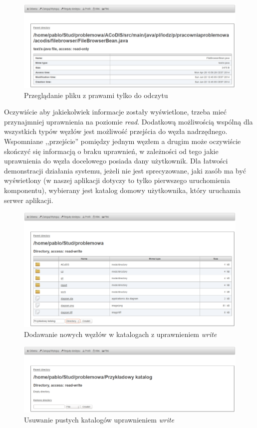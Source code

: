 \documentclass{classrep}
\begin{document}
\begin{figure}[H]
  \caption{Przeglądanie pliku z prawami tylko do odczytu}
  \centering
    \includegraphics[width=\textwidth]{pictures/filebrowser/file-ro.png}
\end{figure}

Oczywiście aby jakiekolwiek informacje zostały wyświetlone, trzeba mieć przynajmniej uprawnienia
na poziomie \emph{read}. Dodatkową możliwością wspólną dla wszystkich typów węzłów
jest możliwość przejścia do węzła nadrzędnego. Wspomniane ,,przejście'' pomiędzy jednym
węzłem a drugim może oczywiście skończyć się informacją o braku uprawnień, w zależności
od tego jakie uprawnienia do węzła docelowego posiada dany użytkownik. Dla łatwości demonstracji
działania systemu, jeżeli nie jest sprecyzowane, jaki zasób ma być wyświetlony (w naszej aplikacji
dotyczy to tylko pierwszego uruchomienia komponentu), wybierany jest katalog domowy użytkownika,
który uruchamia serwer aplikacji.

\begin{figure}[H]
  \caption{Dodawanie nowych węzłów w katalogach z uprawnieniem \emph{write}}
  \centering
    \includegraphics[width=\textwidth]{pictures/filebrowser/dir-rw1.png}
\end{figure}

\begin{figure}[H]
  \caption{Usuwanie pustych katalogów uprawnieniem \emph{write}}
  \centering
    \includegraphics[width=\textwidth]{pictures/filebrowser/dir-rw2.png}
\end{figure}
\end{document}
